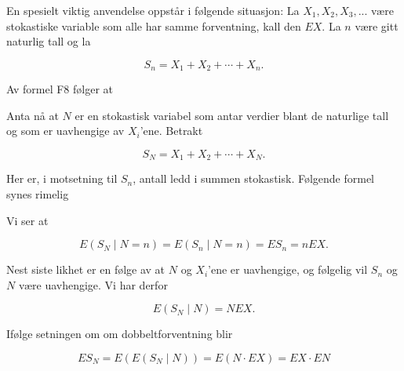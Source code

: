 En spesielt viktig anvendelse oppstår i følgende situasjon:
La $X_1, X_2, X_3, ...$ være stokastiske variable som alle har
samme forventning, kall den $EX$. La $n$ være gitt naturlig tall
og la

\[ S_n=X_1+X_2+ \cdots +X_n. \]
                                          
\noindent Av formel F8 følger at
\begin{center} \framebox[10cm]{\begin{minipage}{9cm}
\[ \mbox{\ \ \ F13. \ \ \ \ } ES_n=n\cdot EX.         \]
\mbox{} \vspace{-0.5\belowdisplayskip}  \end{minipage}} \end{center}
\noindent Anta nå at $N$ er en stokastisk variabel som antar verdier blant
de naturlige tall og som er uavhengige av $X_i$'ene. Betrakt

\[ S_N = X_1 + X_2 + \cdots + X_N. \]

\noindent Her er, i motsetning til $S_n$, antall ledd i summen stokastisk.
Følgende formel synes rimelig
\begin{center} \framebox[10cm]{\begin{minipage}{9cm}
\[ \mbox{\ \ \ F14. \ \ \ \ }ES_N = EN \cdot EX.   \]
\mbox{} \vspace{-0.5\belowdisplayskip}  \end{minipage}} \end{center}
 Vi ser at
    
\[ E(S_N\mid N=n)=E(S_n\mid N=n)=ES_n=nEX. \]

\noindent Nest siste likhet er en følge av at $N$ og $X_i$'ene er
uavhengige, og følgelig vil $S_n$ og $N$ være uavhengige. Vi har
derfor

\[ E(S_N\mid N)=NEX. \]

\noindent Ifølge setningen om om dobbeltforventning blir

\[ ES_N=E(E(S_N\mid N))=E(N\cdot EX)=EX\cdot EN \]

